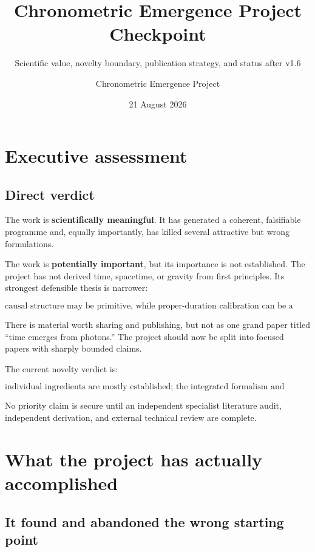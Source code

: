 \documentclass[
  10pt,
]{article}
\title{Chronometric Emergence Project Checkpoint}
\subtitle{Scientific value, novelty boundary, publication strategy, and
status after v1.6}
\author{Chronometric Emergence Project}
\date{21 August 2026}
\begin{document}
\maketitle

{
\hypersetup{linkcolor=}
\setcounter{tocdepth}{3}
\tableofcontents
}
\section{Executive assessment}\label{executive-assessment}

\subsection{Direct verdict}\label{direct-verdict}

The work is \textbf{scientifically meaningful}. It has generated a
coherent, falsifiable programme and, equally importantly, has killed
several attractive but wrong formulations.

The work is \textbf{potentially important}, but its importance is not
established. The project has not derived time, spacetime, or gravity
from first principles. Its strongest defensible thesis is narrower:

\[
\boxed{
\text{causal structure may be primitive, while proper-duration calibration can be a field-generated spectral relation.}
}
\]

There is material worth sharing and publishing, but not as one grand
paper titled ``time emerges from photons.'' The project should now be
split into focused papers with sharply bounded claims.

The current novelty verdict is:

\[
\boxed{
\text{individual ingredients are mostly established; the integrated formalism and several model-specific relations are candidate new contributions.}
}
\]

No priority claim is secure until an independent specialist literature
audit, independent derivation, and external technical review are
complete.

\section{What the project has actually
accomplished}\label{what-the-project-has-actually-accomplished}

\subsection{It found and abandoned the wrong starting
point}\label{it-found-and-abandoned-the-wrong-starting-point}
\end{document}
